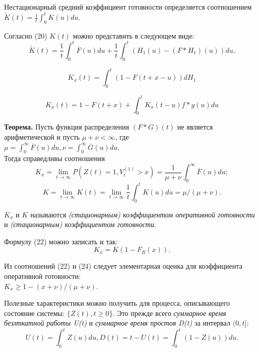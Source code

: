 Нестационарный средний коэффициент готовности определяется соотношением\\
$\check{K}(t) = \frac{1}{t} \int_0^t K(u) du$.

Согласно (20) $K(t)$ можно представить в следующем виде:
\begin{equation}
\check{K}(t) = \frac{1}{t}\int_0^t \overline{F}(u) du + \frac{1}{t}\int_0^t(H_1(u) - (F * H_1)(u)) du.
\end{equation}

 \begin{equation}
 K_x(t) = \int_0^t (1 - F(t+x-u)) dH_1
 \end{equation}
 
  \begin{equation}
 K_x(t) = 1 - F(t+x) + \int_0^t K_x(t - u) f*g(u) du
 \end{equation}

{\bfseries Теорема.} Пусть функция распределения $(F * G)(t)$ не является арифметической и пусть $\mu + \nu < \infty$, где \\
$\mu = \int_0^\infty \overline{F}(u) du, \nu = \int_0^\infty \overline{G}(u) du$.\\
Тогда справедливы соотношения
\begin{equation}
K_x = \lim_{t \to \infty}P(Z(t) = 1, V_t^{(1)} > x) = \frac{1}{\mu + \nu}\int_0^\infty \overline{F}(u) du;
\end{equation} 
\begin{equation}
K = \lim_{t \to \infty}K(t) = \lim_{t \to \infty} \frac{1}{t}\int_0^t K(u) du = \mu/(\mu + \nu).
\end{equation}

$K_x$ и $K$ называются \textit{(стационарным) коэффициентом оперативной готовности} и \textit{(стационарным) коэффициентом готовности}.

Формулу (22) можно записать и так:
\begin{equation}
K_x = K(1 - F_R(x)).
\end{equation}

Из соотношений (22) и (24) следует элементарная оценка для коэффициента оперативной готовности:\\
$K_x \geqslant 1 - (x + \nu)/(\mu + \nu)$.

Полезные характеристики можно получить для процесса, описывающего состояние системы: $\{ Z(t), t \geqslant 0 \}$. Это прежде всего \textit{суммарное время безлткатной работы U(t)} и  \textit{суммарное время простоя D(t)} за интервал $(0, t]$:
\begin{equation}
U(t) = \int_0^t Z(u) du, D(t) = t - U(t) = \int_0^t (1 - Z(u)) du.
\end{equation}

